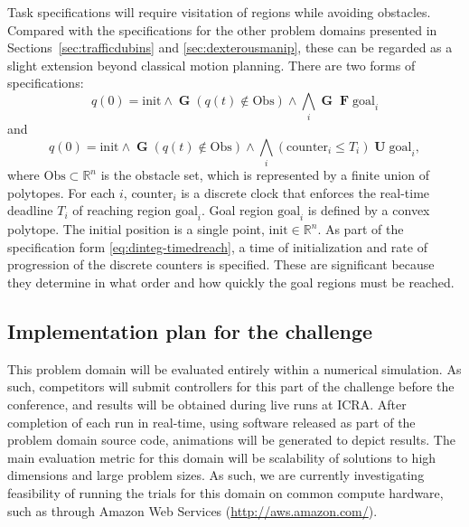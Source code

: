 \documentclass[12pt]{amsart}
\DeclareMathOperator{\Galways}{\mathbf{G}}
\DeclareMathOperator{\Feventually}{\mathbf{F}}
\DeclareMathOperator{\Uuntil}{\mathbf{U}}
\theoremstyle{definition}
\begin{document}
Task specifications will require visitation of regions while avoiding obstacles.
Compared with the specifications for the other problem domains presented in
Sections~\ref{sec:trafficdubins} and \ref{sec:dexterousmanip}, these can be
regarded as a slight extension beyond classical motion planning.  There are two
forms of specifications:
\begin{equation}\label{eq:dinteg-surveillance}
q(0) = \mathrm{init} \wedge \Galways \left( q(t) \notin \mathrm{Obs} \right) \wedge \bigwedge_{i} \Galways \Feventually \mathrm{goal}_i
\end{equation}
and
\begin{equation}\label{eq:dinteg-timedreach}
q(0) = \mathrm{init} \wedge \Galways \left( q(t) \notin \mathrm{Obs} \right) \wedge \bigwedge_{i} \left( \mathrm{counter}_i \leq T_{i} \right) \Uuntil \mathrm{goal}_i ,
\end{equation}
where $\mathrm{Obs} \subset \mathbb{R}^n$ is the obstacle set, which is
represented by a finite union of polytopes.  For each $i$, $\mathrm{counter}_i$
is a discrete clock that enforces the real-time deadline $T_i$ of reaching
region $\mathrm{goal}_i$.  Goal region $\mathrm{goal}_i$ is defined by a convex
polytope.  The initial position is a single point, $\mathrm{init}\in
\mathbb{R}^n$.  As part of the specification form \eqref{eq:dinteg-timedreach},
a time of initialization and rate of progression of the discrete counters is
specified.  These are significant because they determine in what order and how
quickly the goal regions must be reached.

\subsection{Implementation plan for the challenge}

This problem domain will be evaluated entirely within a numerical simulation.  As
such, competitors will submit controllers for this part of the challenge before
the conference, and results will be obtained during live runs at ICRA.  After
completion of each run in real-time, using software released as part of the
problem domain source code, animations will be generated to depict results.  
The main evaluation metric for this domain will be scalability of solutions to high dimensions and
large problem sizes. As such, we are currently investigating feasibility 
of running the trials for this domain on common compute hardware,
such as through Amazon Web Services (\url{http://aws.amazon.com/}).
\end{document}
